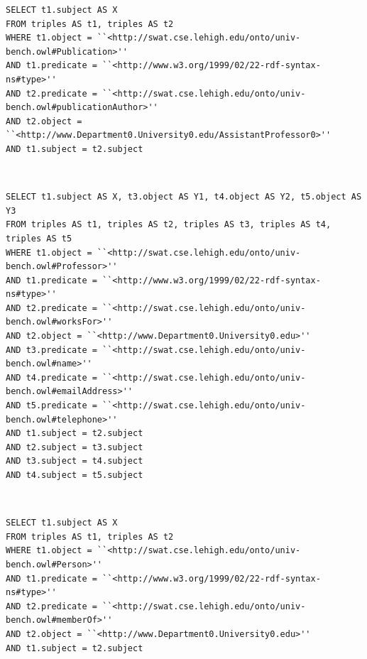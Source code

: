 \documentclass[10pt, a4paper]{report}
\begin{document}
\begin{enumerate}
\begin{minipage}{0.92\textwidth}
		\item \label{query:lumb_sql_3}
		\lstset{language=sql}
		\begin{lstlisting}
SELECT t1.subject AS X
FROM triples AS t1, triples AS t2
WHERE t1.object = ``<http://swat.cse.lehigh.edu/onto/univ-bench.owl#Publication>''
AND t1.predicate = ``<http://www.w3.org/1999/02/22-rdf-syntax-ns#type>''
AND t2.predicate = ``<http://swat.cse.lehigh.edu/onto/univ-bench.owl#publicationAuthor>''
AND t2.object = ``<http://www.Department0.University0.edu/AssistantProfessor0>''
AND t1.subject = t2.subject
                        \end{lstlisting}
	\end{minipage} \\
	\begin{minipage}{0.92\textwidth}
		\item \label{query:lumb_sql_4}
		\lstset{language=sql}
		\begin{lstlisting}
SELECT t1.subject AS X, t3.object AS Y1, t4.object AS Y2, t5.object AS Y3
FROM triples AS t1, triples AS t2, triples AS t3, triples AS t4, triples AS t5
WHERE t1.object = ``<http://swat.cse.lehigh.edu/onto/univ-bench.owl#Professor>''
AND t1.predicate = ``<http://www.w3.org/1999/02/22-rdf-syntax-ns#type>''
AND t2.predicate = ``<http://swat.cse.lehigh.edu/onto/univ-bench.owl#worksFor>''
AND t2.object = ``<http://www.Department0.University0.edu>''
AND t3.predicate = ``<http://swat.cse.lehigh.edu/onto/univ-bench.owl#name>''
AND t4.predicate = ``<http://swat.cse.lehigh.edu/onto/univ-bench.owl#emailAddress>''
AND t5.predicate = ``<http://swat.cse.lehigh.edu/onto/univ-bench.owl#telephone>''
AND t1.subject = t2.subject
AND t2.subject = t3.subject
AND t3.subject = t4.subject
AND t4.subject = t5.subject
                        \end{lstlisting}
	\end{minipage} \\
	\begin{minipage}{0.92\textwidth}
		\item \label{query:lumb_sql_5}
		\lstset{language=sql}
		\begin{lstlisting}
SELECT t1.subject AS X
FROM triples AS t1, triples AS t2
WHERE t1.object = ``<http://swat.cse.lehigh.edu/onto/univ-bench.owl#Person>''
AND t1.predicate = ``<http://www.w3.org/1999/02/22-rdf-syntax-ns#type>''
AND t2.predicate = ``<http://swat.cse.lehigh.edu/onto/univ-bench.owl#memberOf>''
AND t2.object = ``<http://www.Department0.University0.edu>''
AND t1.subject = t2.subject
                        \end{lstlisting}

\end{minipage}
\end{enumerate}
\end{document}
